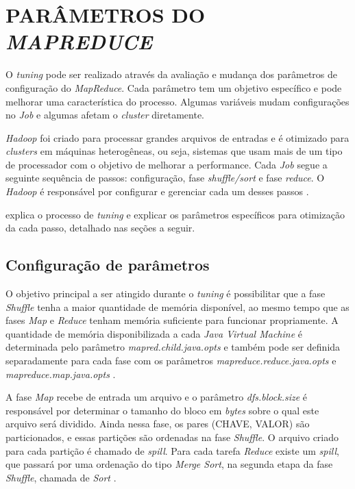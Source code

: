 \section{PARÂMETROS DO \textit{MAPREDUCE}} \label{sec:parametrosmapreduce}

O \textit{tuning} pode ser realizado através da avaliação e mudança dos parâmetros de configuração do \textit{MapReduce}. Cada parâmetro tem um objetivo específico e pode melhorar uma característica do processo. Algumas variáveis mudam configurações no \textit{Job} e algumas afetam o \textit{cluster} diretamente.

\textit{Hadoop} foi criado para processar grandes arquivos de entradas e é otimizado para \textit{clusters} em máquinas heterogêneas, ou seja, sistemas que usam mais de um tipo de processador com o objetivo de melhorar a performance. Cada \textit{Job} segue a seguinte sequência de passos: configuração, fase \textit{shuffle/sort} e fase \textit{reduce}. O \textit{Hadoop} é responsável por configurar e gerenciar cada um desses passos \cite{ProHadoop09}.

\textcite{HadoopBook15} explica o processo de \textit{tuning} e explicar os parâmetros específicos para otimização da cada passo, detalhado nas seções a seguir.

\subsection{Configuração de parâmetros}\label{ssec:configuracaooparametros}

O objetivo principal a ser atingido durante o \textit{tuning} é possibilitar que a fase \textit{Shuffle} tenha a maior quantidade de memória disponível, ao mesmo tempo que as fases \textit{Map} e \textit{Reduce} tenham memória suficiente para funcionar propriamente. A quantidade de memória disponibilizada a cada \textit{Java Virtual Machine} é determinada pelo parâmetro \textit{mapred.child.java.opts} e também pode ser definida separadamente para cada fase com os parâmetros \textit{mapreduce.reduce.java.opts} e \textit{mapreduce.map.java.opts} \cite{HadoopBook15}.

A fase \textit{Map} recebe de entrada um arquivo e o parâmetro \textit{dfs.block.size} é responsável por determinar o tamanho do bloco em \textit{bytes} sobre o qual este arquivo será dividido. Ainda nessa fase, os pares (CHAVE, VALOR) são particionados, e essas partições são ordenadas na fase \textit{Shuffle}. O arquivo criado para cada partição é chamado de \textit{spill}. Para cada tarefa \textit{Reduce} existe um \textit{spill}, que passará por uma ordenação do tipo \textit{Merge Sort}, na segunda etapa da fase \textit{Shuffle}, chamada de \textit{Sort} \cite{ProHadoop09}.

